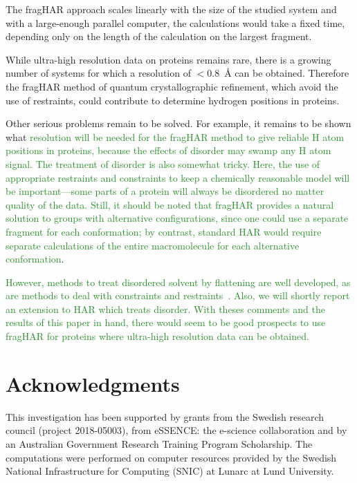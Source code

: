 \documentclass[preprint,dvipsnames]{iucr}              %
\newcommand{\changed}[1]{\textcolor{ForestGreen}{#1}}
\begin{document}
The fragHAR approach scales linearly with the size of the studied 
system and with a large-enough parallel computer, the calculations 
would take a fixed time, depending only on the length of the 
calculation on the largest fragment.

While ultra-high resolution data on proteins remains rare, there is a growing number 
of systems for which a resolution of  $<$0.8~\AA{}  can be obtained. 
Therefore the fragHAR method of quantum crystallographic 
refinement, which avoid the use of restraints, could contribute to determine 
hydrogen positions in proteins. 

Other serious problems remain to be solved. For example,
it remains to be shown what \changed{resolution will be needed
for the fragHAR method to give reliable H atom positions in proteins, 
because the effects of disorder may swamp any H atom signal.
The treatment of disorder is also somewhat tricky. Here,
the use of appropriate restraints and constraints to keep a 
chemically reasonable model will be important---some parts of 
a protein will always be disordered no matter quality of the data.
Still, it should be noted that fragHAR provides a natural solution 
to groups with alternative configurations, since one could use
a separate fragment for each conformation; by contrast, standard 
HAR would require separate calculations of the entire macromolecule 
for each alternative conformation}.

\changed{However, methods to treat disordered solvent by 
flattening  are well developed, as are methods to deal with 
constraints and restraints~\cite{sheldrick2015crystal}.
Also, we will shortly report an extension to HAR which 
treats disorder. With theses comments and the results of this 
paper in hand, there would seem to be good prospects to use 
fragHAR for  proteins where ultra-high resolution data can 
be obtained.}




\section{Acknowledgments}

This investigation has been supported by grants from the Swedish research council (project 2018-05003), from eSSENCE: the e-science collaboration and by an Australian Government Research Training Program Scholarship. 
The computations were performed on computer resources provided by the Swedish National Infrastructure for Computing (SNIC) at Lunarc at Lund University.






\end{document}
